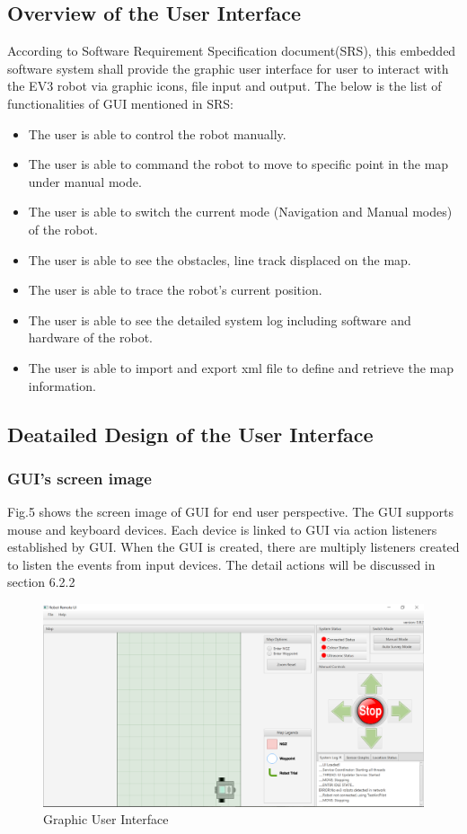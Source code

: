 \subsection{Overview of the User Interface}
According to Software Requirement Specification document(SRS), this embedded software system shall provide the graphic user interface for user to interact with the EV3 robot via graphic icons, file input and output. The below is the list of functionalities of GUI mentioned in SRS:
\begin{itemize}
	\item The user is able to control the robot manually.
	\item The user is able to command the robot to move to specific point in the map under manual mode.
	\item The user is able to switch the current mode (Navigation and Manual modes) of the robot.
	\item The user is able to see the obstacles, line track displaced on the map.
	\item The user is able to trace the robot's current position.
	\item The user is able to see the detailed system log including software and hardware of the robot.
	\item The user is able to import and export xml file to define and retrieve the map information.
\end{itemize}
\subsection{Deatailed Design of the User Interface}
\subsubsection{GUI's screen image}
Fig.5 shows the screen image of GUI for end user perspective. The GUI supports mouse and keyboard devices. Each device is linked to GUI via action listeners established by GUI. When the GUI is created, there are multiply listeners created to listen the events from input devices. The detail actions will be discussed in section 6.2.2  
\begin{figure}[H]
	\includegraphics[width=\linewidth]{GUI.PNG}  %
	\caption{Graphic User Interface}
	\label{fig:Graphic User Interface}				
\end{figure}
